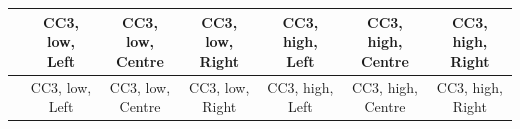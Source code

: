 
\begin{center}
\begin{small}
\begin{longtable}{l@{} c@{} c@{} c@{} c@{} c@{} c@{}}
\hline
 & \shortstack{\rule{0pt}{2.2ex}\hspace{0.25cm}CC3, low,\hspace{0.25cm}\\Left} & \shortstack{\rule{0pt}{2.2ex}\hspace{0.25cm}CC3, low,\hspace{0.25cm}\\Centre} & \shortstack{\rule{0pt}{2.2ex}\hspace{0.25cm}CC3, low,\hspace{0.25cm}\\Right} & \shortstack{\rule{0pt}{2.2ex}\hspace{0.25cm}CC3, high,\hspace{0.25cm}\\Left} & \shortstack{\rule{0pt}{2.2ex}\hspace{0.25cm}CC3, high,\hspace{0.25cm}\\Centre} & \shortstack{\rule{0pt}{2.2ex}\hspace{0.25cm}CC3, high,\hspace{0.25cm}\\Right} \\
\hline
\endfirsthead
\hline
 & \shortstack{\rule{0pt}{2.2ex}\hspace{0.25cm}CC3, low,\hspace{0.25cm}\\Left} & \shortstack{\rule{0pt}{2.2ex}\hspace{0.25cm}CC3, low,\hspace{0.25cm}\\Centre} & \shortstack{\rule{0pt}{2.2ex}\hspace{0.25cm}CC3, low,\hspace{0.25cm}\\Right} & \shortstack{\rule{0pt}{2.2ex}\hspace{0.25cm}CC3, high,\hspace{0.25cm}\\Left} & \shortstack{\rule{0pt}{2.2ex}\hspace{0.25cm}CC3, high,\hspace{0.25cm}\\Centre} & \shortstack{\rule{0pt}{2.2ex}\hspace{0.25cm}CC3, high,\hspace{0.25cm}\\Right} \\

\end{longtable}
\end{small}
\end{center}
